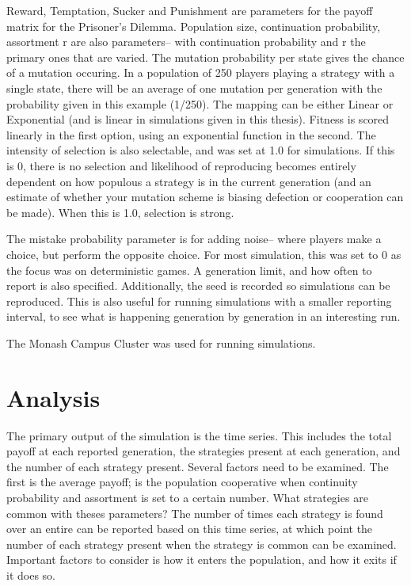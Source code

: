 \documentclass[a4paper,11pt,bcshonoursthesis,singlespace,twoside,thesisdraft,pdflatex]{cssethesis}
\begin{document}
Reward, Temptation, Sucker and Punishment are parameters for the payoff matrix for the Prisoner's Dilemma. 
Population size, continuation probability, assortment r are also parameters-- with continuation probability and r the primary ones that are varied. 
The mutation probability per state gives the chance of a mutation occuring. In a population of 250 players playing a strategy with a single state, there will be an average of one mutation per generation with the probability given in this example (1/250). The mapping can be either Linear or Exponential (and is linear in simulations given in this thesis). 
Fitness is scored linearly in the first option, using an exponential function in the second. 
The intensity of selection is also selectable, and was set at 1.0 for simulations. 
If this is 0, there is no selection and likelihood of reproducing becomes entirely dependent on how populous a strategy is in the current generation (and an estimate of whether your mutation scheme is biasing defection or cooperation can be made). When this is 1.0, selection is strong. 

The mistake probability parameter is for adding noise-- where players make a choice, but perform the opposite choice. For most simulation, this was set to 0 as the focus was on deterministic games. 
A generation limit, and how often to report is also specified. Additionally, the seed is recorded so simulations can be reproduced. This is also useful for running simulations with a smaller reporting interval, to see what is happening generation by generation in an interesting run. 


The Monash Campus Cluster \citep{cluster} was used for running simulations. 

\section{Analysis}
The primary output of the simulation is the time series. 
This includes the total payoff at each reported generation, the strategies present at each generation, and the number of each strategy present. 
Several factors need to be examined. The first is the average payoff; is the population cooperative when continuity probability and assortment is set to a certain number. 
What strategies are common with theses parameters? 
The number of times each strategy is found over an entire can be reported based on this time series, at which point the number of each strategy present when the strategy is common can be examined. Important factors to consider is how it enters the population, and how it exits if it does so. 
\end{document}
